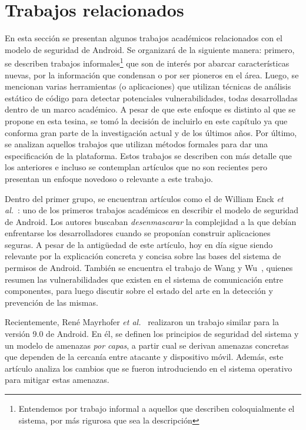 
\chapter{Trabajos relacionados}
\label{chapter:estado}

En esta sección se presentan algunos trabajos académicos relacionados con el modelo de seguridad de
Android. Se organizará de la siguiente manera: primero, se describen trabajos
informales\footnote{Entendemos por trabajo informal a aquellos que describen coloquialmente el
    sistema, por más rigurosa que sea la descripción} que son de interés por abarcar características
nuevas, por la información que condensan o por ser pioneros en el área. Luego, se mencionan varias
herramientas (o aplicaciones) que utilizan técnicas de análisis estático de código para detectar
potenciales vulnerabilidades, todas desarrolladas dentro de un marco académico. A pesar de que este
enfoque  es distinto al que se propone en esta tesina, se tomó la decisión de incluirlo en este
capítulo ya que conforma gran parte de la investigación actual y de los últimos años. Por último, se
analizan aquellos trabajos que utilizan métodos formales para dar una especificación de la
plataforma. Estos trabajos se describen con más detalle que los anteriores e incluso se contemplan
artículos que no son recientes pero presentan un enfoque novedoso o relevante a este trabajo.

Dentro del primer grupo, se encuentran artículos como el de William Enck \textit{et
    al.}~\cite{enck}: uno de los primeros trabajos académicos en describir el modelo de seguridad de
Android. Los autores buscaban \textit{desenmascarar} la complejidad a la que debían enfrentarse los
desarrolladores cuando se proponían construir aplicaciones seguras. A pesar de la antigüedad de este
artículo, hoy en día sigue siendo relevante por la explicación concreta y concisa sobre las bases
del sistema de permisos de Android. También se encuentra el trabajo de Wang y Wu~\cite{wang},
quienes resumen las vulnerabilidades que existen en el sistema de comunicación entre componentes,
para luego discutir sobre el estado del arte en la detección y prevención de las mismas.

Recientemente, René Mayrhofer \textit{et al.}~\cite{mayrhofer} realizaron un trabajo similar para la
versión 9.0 de Android. En él, se definen los principios de seguridad del sistema y un modelo de
amenazas \textit{por capas}, a partir cual se derivan amenazas concretas que dependen de la cercanía
entre atacante y dispositivo móvil. Además, este artículo analiza los cambios que se fueron
introduciendo en el sistema operativo para mitigar estas amenazas.

